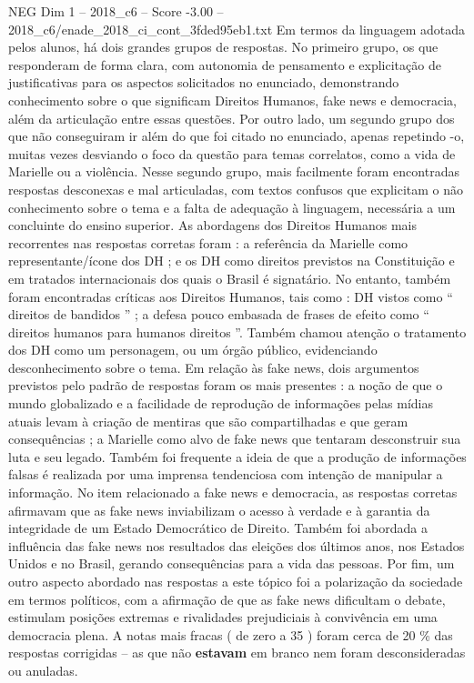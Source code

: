 \begin{textsample}{NEG Dim 1 – 2018\_c6 – Score -3.00 – 2018\_c6/enade\_2018\_ci\_cont\_3fded95eb1.txt}
Em termos da linguagem adotada pelos alunos, há dois grandes grupos de respostas.
No primeiro grupo, os que responderam de forma clara, com autonomia de pensamento e explicitação de justificativas para os aspectos solicitados no enunciado, demonstrando conhecimento sobre o que significam Direitos Humanos, fake news e democracia, além da articulação entre essas questões.
Por outro lado, um segundo grupo dos que não conseguiram ir além do que foi citado no enunciado, apenas repetindo -o, muitas vezes desviando o foco da questão para temas correlatos, como a vida de Marielle ou a violência.
Nesse segundo grupo, mais facilmente foram encontradas respostas desconexas e mal articuladas, com textos confusos que explicitam o não conhecimento sobre o tema e a falta de adequação à linguagem, necessária a um concluinte do ensino superior.
As abordagens dos Direitos Humanos mais recorrentes nas respostas corretas foram : a referência da Marielle como representante/ícone dos DH ; e os DH como direitos previstos na Constituição e em tratados internacionais dos quais o Brasil é signatário.
No entanto, também foram encontradas críticas aos Direitos Humanos, tais como : DH vistos como “ direitos de bandidos ” ; a defesa pouco embasada de frases de efeito como “ direitos humanos para humanos direitos ”.
Também chamou atenção o tratamento dos DH como um personagem, ou um órgão público, evidenciando desconhecimento sobre o tema.
Em relação às fake news, dois argumentos previstos pelo padrão de respostas foram os mais presentes : a noção de que o mundo globalizado e a facilidade de reprodução de informações pelas mídias atuais levam à criação de mentiras que são compartilhadas e que geram consequências ; a Marielle como alvo de fake news que tentaram desconstruir sua luta e seu legado.
Também foi frequente a ideia de que a produção de informações falsas é realizada por uma imprensa tendenciosa com intenção de manipular a informação.
No item relacionado a fake news e democracia, as respostas corretas afirmavam que as fake news inviabilizam o acesso à verdade e à garantia da integridade de um Estado Democrático de Direito.
Também foi abordada a influência das fake news nos resultados das eleições dos últimos anos, nos Estados Unidos e no Brasil, gerando consequências para a vida das pessoas.
Por fim, um outro aspecto abordado nas respostas a este tópico foi a polarização da sociedade em termos políticos, com a afirmação de que as fake news dificultam o debate, estimulam posições extremas e rivalidades prejudiciais à convivência em uma democracia plena.
A notas mais fracas ( de zero a 35 ) foram cerca de 20 \% das respostas corrigidas – as que não \textbf{estavam} em branco nem foram desconsideradas ou anuladas.

\end{textsample}
